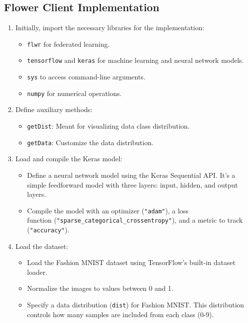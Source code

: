 \documentclass{article}
\begin{document}
\subsection{Flower Client Implementation}
\begin{enumerate}
    \item Initially, import the necessary libraries for the implementation:
    \begin{itemize}
        \item \texttt{flwr} for federated learning.
        \item \texttt{tensorflow} and \texttt{keras} for machine learning and neural network models.
        \item \texttt{sys} to access command-line arguments.
        \item \texttt{numpy} for numerical operations.
    \end{itemize}
    \item Define auxiliary methods:
    \begin{itemize}
        \item \texttt{getDist}: Meant for visualizing data class distribution.
        \item \texttt{getData}: Customize the data distribution.
    \end{itemize}
    \item Load and compile the Keras model:
    \begin{itemize}
        \item Define a neural network model using the Keras Sequential API. It's a simple feedforward model with three layers: input, hidden, and output layers.
        \item Compile the model with an optimizer (\texttt{"adam"}), a loss \\ function (\texttt{"sparse\_categorical\_crossentropy"}), and a metric to track (\texttt{"accuracy"}).
    \end{itemize}
    \item Load the dataset:
    \begin{itemize}
        \item Load the Fashion MNIST dataset using TensorFlow's built-in dataset loader.
        \item Normalize the images to values between 0 and 1.
        \item Specify a data distribution (\texttt{dist}) for Fashion MNIST. This distribution controls how many samples are included from each class (0-9).
    \end{itemize}

\end{enumerate}
\end{document}
